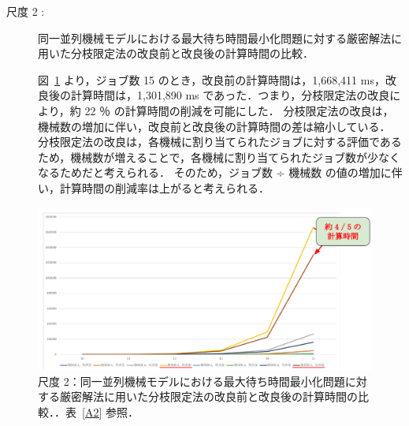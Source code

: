 \documentclass[12pt]{optlab-bachelor}
\begin{document}
\begin{description}
  \item[尺度 2 :] 同一並列機械モデルにおける最大待ち時間最小化問題に対する厳密解法に用いた分枝限定法の改良前と改良後の計算時間の比較．

  図~\ref{5.2} より，ジョブ数 15 のとき，改良前の計算時間は，1,668,411 ms，改良後の計算時間は，1,301,890 ms であった．つまり，分枝限定法の改良により，約 22 ％ の計算時間の削減を可能にした．
  分枝限定法の改良は，機械数の増加に伴い，改良前と改良後の計算時間の差は縮小している．
  分枝限定法の改良は，各機械に割り当てられたジョブに対する評価であるため，機械数が増えることで，各機械に割り当てられたジョブ数が少なくなるためだと考えられる．
  そのため，ジョブ数 ÷ 機械数 の値の増加に伴い，計算時間の削減率は上がると考えられる．
\end{description}
\begin{figure}[ht]
  \centering
  \includegraphics[width = 16cm]{figure/BandBTimeId.pdf}
  \caption{尺度 2：同一並列機械モデルにおける最大待ち時間最小化問題に対する厳密解法に用いた分枝限定法の改良前と改良後の計算時間の比較．．表~\ref{A2} 参照．}
  \label{5.2}
\end{figure}
\end{document}
